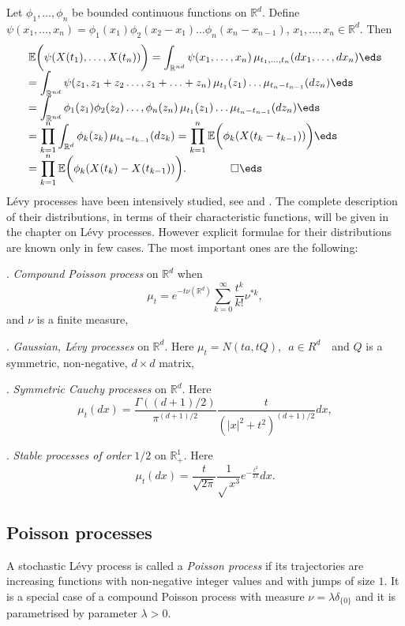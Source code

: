 \documentclass[preprint]{imsart}
\def\E{\mathbb E}
\def\R{\mathbb R}
\def\ds{\displaystyle}
\begin{document}
{
Let $\phi_1,\ldots,\phi_n$ be bounded continuous
functions on $\R^d$. Define $\psi (x_1,\ldots,x_n)=
\phi_1(x_1)\phi_2(x_2-x_1)\ldots\phi_n(x_n-x_{n-1})$,
 $x_1,\ldots,x_n\in\R^d$. Then
$$
  \begin{array}{l}
    \E \bigg(\psi(X(t_1),\ldots,X(t_n))\bigg)
    =\ds
\int_{\R^{nd}}\psi (x_1,\ldots,x_n)\,
 \mu_{t_1, \ldots ,t_n}(dx_1,\ldots,dx_n)
   \eds  \\\ds
   = \int_{\R^{nd}}\psi (z_1,z_1+z_2\ldots,z_1+\ldots +z_n)\,
 \mu_{t_1}(z_1)\ldots \mu_{t_n-t_{n-1}}(dz_n)
 \eds\\\ds
 =
\int_{\R^{nd}}\phi_1(z_1)\phi_2(z_2)\ldots,\phi_n(z_n)\,
 \mu_{t_1}(z_1)\ldots \mu_{t_n-t_{n-1}}(dz_n)
 \eds\\\ds
=\prod
_{k=1}^{n} \int_{\R^{d}} \phi_k(z_k)\,
\mu_{t_k-t_{k-1}}(dz_k)
=\prod
_{k=1}^{n} \E \bigg(\phi_k(X(t_k-t_{k-1}))\bigg)
\eds\\\ds
=\prod
_{k=1}^{n} \E \bigg(\phi_k(X(t_k)-X(t_{k-1}))\bigg).
\qquad
\qed
\eds
  \end{array}
$$
L\'evy processes have been intensively studied, see \cite{sato} and \cite{bertoin}. The complete description
of their distributions, in terms of their characteristic functions,  will be given in the chapter
on L\'evy processes. However explicit formulae for their distributions are known only in few cases. The most
important ones are the following:
\vspace{2mm}

. {\it Compound Poisson process} on $\R^d$ when
$$
\mu_t  = e^{-t \nu(\R^d)}\sum_{k=0}^{\infty}{\frac{t^k}{k!}}\nu^{*k},
$$
and $\nu$ is a finite measure,
\vspace{2mm}

. {\it Gaussian, L\'evy processes} on $\R^d$. Here
$\mu_t = N( ta, tQ)$,\,\,\,\,$a\in R^d$\,\,\,\, and $Q$ is a symmetric, non-negative, $d\times d$ matrix,
\vspace{2mm}

. {\it Symmetric Cauchy processes} on $\R^d$. Here
$$
\mu_t (dx) = {\frac{\Gamma ((d+1)/2)}{\pi^{(d+1)/2}}}{\frac{t}{(|x|^2 + t^2 )^{(d+1)/2}}}dx,
$$
\vspace{2mm}

. {\it Stable processes of order} $1/2$ on $\R_{+}^1$. Here
$$
\mu_t (dx) = {\frac{t}{\sqrt{2\pi}}}{\frac{1}{\sqrt{}x^3}} e^{-{\frac{t^2}{2x}}}dx.
$$
\subsection{Poisson processes}
A stochastic L\'evy process is called a {\it Poisson process} if its trajectories are increasing functions
with non-negative integer values and with jumps of size $1$. It is a special case of a compound Poisson
process with measure $\nu = \lambda \delta_{\{0\}}$ and it is parametrised by parameter $\lambda > 0$.
\vspace{2mm}

}
\end{document}
